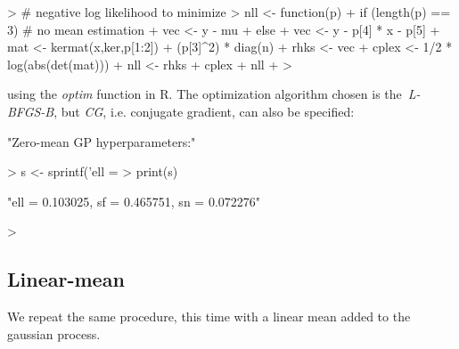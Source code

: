 \documentclass[a4paper]{article}
\begin{document}
\begin{Schunk}
\begin{Sinput}
> # negative log likelihood to minimize
> nll <- function(p) {
+ 	if (length(p) == 3) # no mean estimation
+ 		vec <- y - mu 
+ 	else 
+ 		vec <- y - p[4] * x - p[5] 
+ 	mat <- kermat(x,ker,p[1:2]) + (p[3]^2) * diag(n)
+ 	rhks <- vec %*% solve(mat,vec)
+ 	cplex <- 1/2 * log(abs(det(mat)))
+ 	nll <- rhks + cplex
+ 	nll
+ }
> 
\end{Sinput}
\end{Schunk}
using the \emph{optim} function in R. The optimization algorithm chosen is the~\emph{L-BFGS-B}, but \emph{CG}, i.e. conjugate gradient, can also be specified:

\begin{Schunk}
\begin{Soutput}
[1] "Zero-mean GP hyperparameters:"
\end{Soutput}
\begin{Sinput}
> s <- sprintf('ell = %f, sf = %f, sn = %f', ell_est, sf_est, sn_est)
> print(s)
\end{Sinput}
\begin{Soutput}
[1] "ell = 0.103025, sf = 0.465751, sn = 0.072276"
\end{Soutput}
\begin{Sinput}
> 
\end{Sinput}
\end{Schunk}
\subsection{Linear-mean}
We repeat the same procedure, this time with a linear mean added to the gaussian process.
\end{document}
